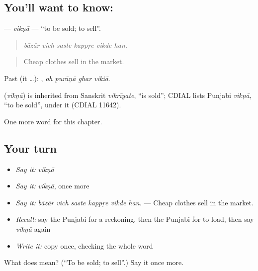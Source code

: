\subsection*{You'll want to know: }
\textbf{} — \emph{vikṇā} — \textquotedblleft{}to be sold; to sell\textquotedblright{}.

\begin{quote}
     
\end{quote}

\begin{quote}
\emph{bāzār vich saste kappṛe vikde han.}
\end{quote}

\begin{quote}
Cheap clothes sell in the market.
\end{quote}

Past (it …):    , \emph{oh purāṇā ghar vikiā}.

\begin{cousinweb}
\textbf{} (\emph{vikṇā}) is inherited from Sanskrit \emph{vikrīyate}, \textquotedblleft{}is sold\textquotedblright{}; CDIAL lists Punjabi \emph{vikṇā}, \textquotedblleft{}to be sold\textquotedblright{}, under it (CDIAL 11642).
\end{cousinweb}

\begin{grammarlens}[title={What you've built}]
One more word for this chapter.
\end{grammarlens}

\subsection*{Your turn}
\begin{itemize}
\raggedright
  \item \emph{Say it:} \emph{vikṇā}
  \item \emph{Say it:} \emph{vikṇā}, once more
  \item \emph{Say it:} \emph{bāzār vich saste kappṛe vikde han.} — Cheap clothes sell in the market.
  \item \emph{Recall:} say the Punjabi for a reckoning, then the Punjabi for to load, then say \emph{vikṇā} again
  \item \emph{Write it:} copy \textbf{} once, checking the whole word
\end{itemize}

\begin{tcolorbox}[breakable,colback=teal!4,colframe=teal!35!black,title={Before you move on}]
What does  mean? (\textquotedblleft{}To be sold; to sell\textquotedblright{}.) Say it once more.
\end{tcolorbox}
